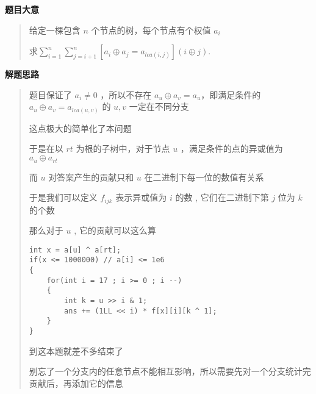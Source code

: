 \documentclass[E:/GsjzTle/main/main.tex]{subfiles}
\begin{document}
\textbf{题目大意}

\begin{quote}
给定一棵包含 \(n\) 个节点的树，每个节点有个权值 \(a_i\)

求\(∑_{i=1}^n∑_{j=i+1}^n[a_i⊕a_j=a_{lca(i,j)}](i⊕j).\)
\end{quote}

\textbf{解题思路}

\begin{quote}
题目保证了 \(a_i ≠ 0\) ，所以不存在
\(a_u⊕a_v = a_u\)，即满足条件的\(a_u ⊕ a_v = a_{lca(u,v)}\) 的 \(u , v\)
一定在不同分支

这点极大的简单化了本问题

于是在以 \(rt\) 为根的子树中，对于节点 \(u\) ，满足条件的点的异或值为
\(a_u ⊕ a_{rt}\)

而 \(u\) 对答案产生的贡献只和 \(u\) 在二进制下每一位的数值有关系

于是我们可以定义 \(f_{ijk}\) 表示异或值为 \(i\) 的数 , 它们在二进制下第
\(j\) 位为 \(k\) 的个数

那么对于 \(u\) , 它的贡献可以这么算

\begin{lstlisting}
int x = a[u] ^ a[rt];
if(x <= 1000000) // a[i] <= 1e6
{
	for(int i = 17 ; i >= 0 ; i --)
	{
		int k = u >> i & 1;
		ans += (1LL << i) * f[x][i][k ^ 1]; 
	}
}
\end{lstlisting}

到这本题就差不多结束了

别忘了一个分支内的任意节点不能相互影响，所以需要先对一个分支统计完贡献后，再添加它的信息
\end{quote}
\end{document}
